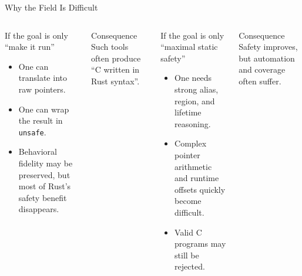 \documentclass[aspectratio=169,11pt,professionalfonts]{beamer}
\newcommand{\good}[1]{\textcolor{SJTUBlue}{#1}}
\begin{document}
\begin{frame}{Why the Field Is Difficult}
  \begin{columns}[t]
    \begin{block}{If the goal is only ``make it run''}
      \begin{itemize}
        \item One can translate into raw pointers.
        \item One can wrap the result in \texttt{unsafe}.
        \item Behavioral fidelity may be preserved, but most of Rust's safety benefit disappears.
      \end{itemize}
      \vspace{1.1em} 
    \end{block}
    \begin{alertblock}{Consequence}
      Such tools often produce ``C written in Rust syntax''.
    \end{alertblock}
    
    \begin{block}{If the goal is only ``maximal static safety''}
      \begin{itemize}
        \item One needs strong alias, region, and lifetime reasoning.
        \item Complex pointer arithmetic and runtime offsets quickly become difficult.
        \item Valid C programs may still be rejected.
      \end{itemize}
    \end{block}
    \begin{alertblock}{Consequence}
      Safety improves, but automation and coverage often suffer.
    \end{alertblock}
  \end{columns}

\end{frame}
\end{document}
